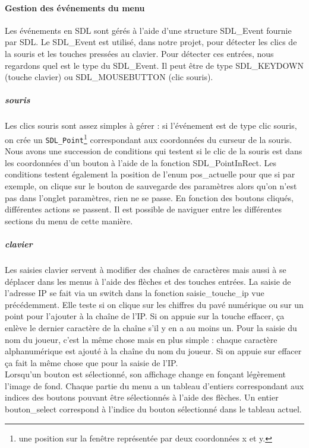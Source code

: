\documentclass[11pt]{article}
\begin{document}
                \paragraph{Gestion des événements du menu}\leavevmode\newline
                Les événements en SDL sont gérés à l’aide d’une structure SDL\_Event fournie par SDL. Le SDL\_Event est utilisé, dans notre projet, pour détecter les clics de la souris et les touches pressées au clavier. Pour détecter ces entrées, nous regardons quel est le type du SDL\_Event. Il peut être de type SDL\_KEYDOWN (touche clavier) ou SDL\_MOUSEBUTTON (clic souris).
                    \subparagraph{souris}\leavevmode\newline
                    Les clics souris sont assez simples à gérer : si l’événement est de type clic souris, on crée un \texttt{SDL\_Point}\footnote{une position sur la fenêtre représentée par deux coordonnées x et y.} correspondant aux coordonnées du curseur de la souris. Nous avons une succession de conditions qui testent si le clic de la souris est dans les coordonnées d’un bouton à l’aide de la fonction SDL\_PointInRect. Les conditions testent également la position de l’enum pos\_actuelle pour que si par exemple, on clique sur le bouton de sauvegarde des paramètres alors qu’on n’est pas dans l’onglet paramètres, rien ne se passe. En fonction des boutons cliqués, différentes actions se passent. Il est possible de naviguer entre les différentes sections du menu de cette manière.
                    \subparagraph{clavier}\leavevmode\newline
                    Les saisies clavier servent à modifier des chaînes de caractères mais aussi à se déplacer dans les menus à l’aide des flèches et des touches entrées. La saisie de l’adresse IP se fait via un switch dans la fonction  saisie\_touche\_ip vue précédemment. Elle teste si on clique sur les chiffres du pavé numérique ou sur un point pour l’ajouter à la chaîne de l’IP. Si on appuie sur la touche effacer, ça enlève le dernier caractère de la chaîne s’il y en a au moins un. Pour la saisie du nom du joueur, c’est la même chose mais en plus simple : chaque caractère alphanumérique est ajouté à la chaîne du nom du joueur. Si on appuie sur effacer ça fait la même chose que pour la saisie de l’IP.\\
                    Lorsqu’un bouton est sélectionné, son affichage change en fonçant légèrement l’image de fond. Chaque partie du menu a un tableau d’entiers correspondant aux indices des boutons pouvant être sélectionnés à l’aide des flèches. Un entier bouton\_select correspond à l’indice du bouton sélectionné dans le tableau actuel. \\
\end{document}
